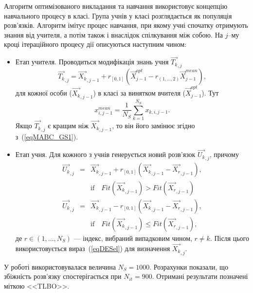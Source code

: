 Алгоритм оптимізованого викладання та навчання використовує концепцію навчального процесу в класі.
Група учнів у класі розглядається як популяція розв'язків.
Алгоритм імітує процес навчання, при якому учні спочатку отримують знання від учителя, а потім також і внаслідок спілкування між собою.
На $j$--му кроці ітераційного процесу дії описуються наступним чином\cite{TLBO_Patel}:
\begin{itemize}[leftmargin=0cm,itemindent=1em]
  \item Етап учителя.
 Проводиться модифікація знань учня $\overrightarrow{T_{k}}_{,j}$
   \begin{equation}
  \label{eqTLBOTP}
   \overrightarrow{T_{k}}_{,j}=\overrightarrow{X_{k}}_{,j-1}+r_{[0,1]}\left(\overrightarrow{X}_{j-1}^{opt}-
      r_{(1,\ldots,2)}\overrightarrow{X}_{j-1}^{mean}\right),
  \end{equation}
  для кожної особи ($\overrightarrow{X_{k}}_{,j-1}$) в класі за винятком вчителя ($\overrightarrow{X}_{j-1}^{opt}$).
  Тут
    \begin{equation}
 \label{eqTLBOMean}
  x_{i,j-1}^{mean}=\frac{1}{N_S}\sum_{k=1}^{N_S}x_{k,i,j-1}.
  \end{equation}
  Якщо $\overrightarrow{T_{k}}_{,j}$ є кращим ніж $\overrightarrow{X_{k}}_{,j-1}$, то він його замінює згідно з~(\ref{eqMABC_GS1}).



  \item Етап учня.
  Для кожного з учнів генерується новий розв'язок $\overrightarrow{U_{k}}_{,j}$, причому
\begin{eqnarray}
 \label{eqTLBOLP}
 \overrightarrow{U_{k}}_{,j}&=&\overrightarrow{X_{k}}_{,j-1}+r_{[0,1]}\left(\overrightarrow{X_{k}}_{,j-1}-\overrightarrow{X_{r}}_{,j-1}\right),
\\
&& \text{if}\quad Fit(\overrightarrow{X_{k}}_{,j-1})>Fit(\overrightarrow{X_{r}}_{,j-1})
\nonumber
\\
 \label{eqTLBOLP2}
 \overrightarrow{U_{k}}_{,j}&=&\overrightarrow{X_{k}}_{,j-1}-r_{[0,1]}\left(\overrightarrow{X_{k}}_{,j-1}-\overrightarrow{X_{r}}_{,j-1}\right),
\\
&& \text{if}\quad Fit(\overrightarrow{X_{k}}_{,j-1})\leq Fit(\overrightarrow{X_{r}}_{,j-1}),
\nonumber
\end{eqnarray}
де
$r\in(1,\ldots,N_S)$ --- індекс, вибраний випадковим чином, $r\neq k$.
Після цього використовується вираз~(\ref{eqDESel}) для визначення $\overrightarrow{X_{k}}_{,j}$.
\end{itemize}
У роботі використовувалася величина $N_S=1000$.
Розрахунки показали, що збіжність розв'язку спостерігається при $N_{it}=900$.
Отримані результати позначені міткою <<TLBO>>.

